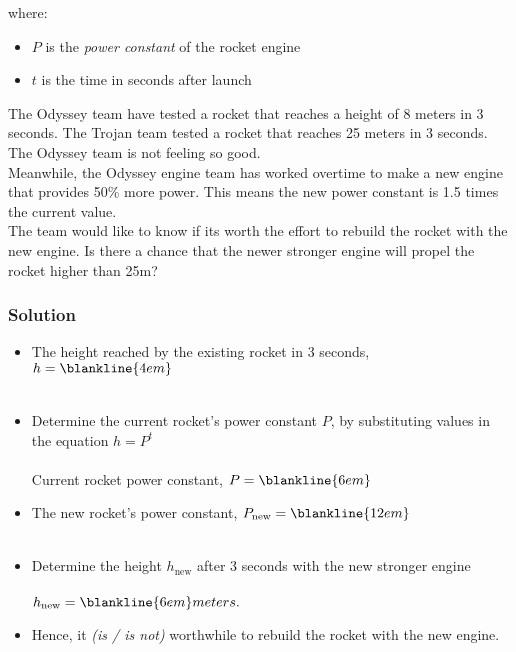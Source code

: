 \documentclass{hw}
\begin{document}
where:
\begin{itemize}
    \item $P$ is the \textit{power constant} of the rocket engine
    \item $t$ is the time in seconds after launch
\end{itemize}

The Odyssey team have tested a rocket that reaches a height of 8 meters in 3 seconds. The Trojan team tested a rocket that reaches 25 meters in 3 seconds.\\
The Odyssey team is not feeling so good. \\

Meanwhile, the Odyssey engine team has worked overtime to make a new engine that provides 50\% more power. This means the new power constant is 1.5 times the current value.\\

The team would like to know if its worth the effort to rebuild the rocket with the new engine. Is there a chance that the newer stronger engine will propel the rocket higher than 25m?

\subsubsection*{Solution}
\begin{itemize}
\item The height reached by the existing rocket in 3 seconds, $h = \blankline{4em}$\\
\vspace*{0.5cm}\\
\item Determine the current rocket's power constant $P$, by substituting values in the equation $h=P^t$ \\
\vspace*{5cm}\\
Current rocket power constant, $P = \blankline{6em}$\\
\item The new rocket's power constant, $ P_{\text{new}} = \blankline{12em} $ \\
\vspace*{0.5cm}\\
\item Determine the height $h_{\text{new}}$ after 3 seconds with the new stronger engine\\
\vspace*{5cm}\\
$ h_{\text{new}} = \blankline{6em} meters.$
\vspace*{0.5cm}
\item Hence, it \blankline{8em} \textit{(is / is not)} worthwhile to rebuild the rocket with the new engine. \\
\end{itemize}
\end{document}
